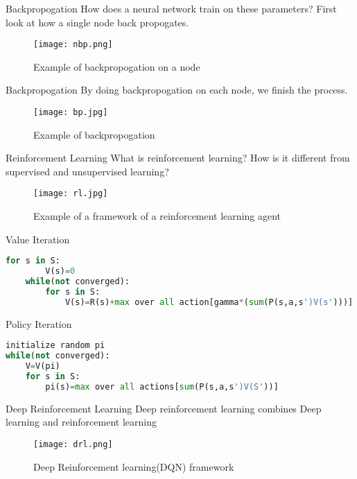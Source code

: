 \begin{frame}{Backpropogation}
    How does a neural network train on these parameters? First look at how a single node back propogates.
    \begin{figure}
        \centering
        \texttt{[image: nbp.png]}\\
        \caption{Example of backpropogation on a node}
        \label{fig:nbp}
    \end{figure}
\end{frame}

\begin{frame}{Backpropogation}
    By doing backpropogation on each node, we finish the process. 
    \begin{figure}
        \centering
        \texttt{[image: bp.jpg]}\\
        \caption{Example of backpropogation }
        \label{fig:bp}
    \end{figure}
\end{frame}

\begin{frame}{Reinforcement Learning}
    What is reinforcement learning? How is it different from supervised and unsupervised learning?
    \begin{figure}
        \centering
        \texttt{[image: rl.jpg]}\\
        \caption{Example of a framework of a reinforcement learning agent }
        \label{fig:rl}
    \end{figure}
\end{frame}

\begin{frame}[fragile]{Value Iteration}
    \begin{lstlisting}[language=python, caption=value iteration algorithm]
    for s in S:
        V(s)=0
    while(not converged):
        for s in S:
            V(s)=R(s)+max over all action[gamma*(sum(P(s,a,s')V(s')))]
    \end{lstlisting}
\end{frame}

\begin{frame}[fragile]{Policy Iteration}
\begin{lstlisting}[language=python, caption=Policy iteration algorithm]
initialize random pi
while(not converged):
    V=V(pi)
    for s in S:
        pi(s)=max over all actions[sum(P(s,a,s')V(S'))]
\end{lstlisting}
\end{frame}

\begin{frame}{Deep Reinforcement Learning}
    Deep reinforcement learning combines Deep learning and reinforcement learning
    \begin{figure}
        \centering
        \texttt{[image: drl.png]}\\
        \caption{Deep Reinforcement learning(DQN) framework}
        \label{fig:drl}
    \end{figure}
\end{frame}
